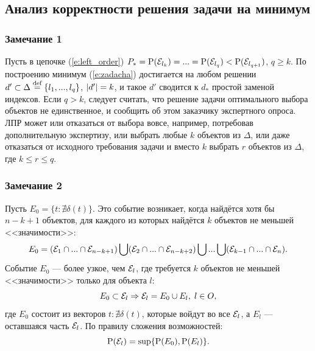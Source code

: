 \subsection{Анализ корректности решения задачи на минимум}
\subsubsection*{Замечание 1}

Пусть в цепочке (\ref{e:left_order}) $P_* = {\mathrm{P}}(\mathcal{E}_{l_k}) = ... = {\mathrm{P}}(\mathcal{E}_{l_q}) < {\mathrm{P}}(\mathcal{E}_{l_{q+1}})$, $q \geq k$. По построению минимум (\ref{e:zadacha}) достигается на любом решении $d' \subset \Delta \overset{\text{def}}{=} \{l_1, ..., l_q\}$, $\left| d' \right| = k$, и такое $d'$ сводится к $d_*$ простой заменой индексов. Если $q > k$, следует считать, что решение задачи оптимального выбора объектов не единственное, и сообщить об этом заказчику экспертного опроса. ЛПР может или отказаться от выбора вовсе, например, потребовав дополнительную экспертизу, или выбрать любые $k$ объектов из $\Delta$, или даже отказаться от исходного требования задачи и вместо $k$ выбрать $r$ объектов из $\Delta$, где $k \leq r \leq q$.

\subsubsection*{Замечание 2}
Пусть $E_0 = \{t: \nexists \delta(t)\}$. Это событие возникает, когда найдётся хотя бы $n-k+1$ объектов, для каждого из которых найдётся $k$ объектов не меньшей <<значимости>>:
\begin{equation*}
 E_0 = (\mathcal{E}_1 \cap ... \cap \mathcal{E}_{n-k+1}) \bigcup (\mathcal{E}_2 \cap ... \cap \mathcal{E}_{n-k+2}) \bigcup ... \bigcup (\mathcal{E}_{k-1} \cap ... \cap \mathcal{E}_{n}).
\end{equation*}
Событие $E_0$ --- более узкое, чем $\mathcal{E}_l$, где требуется $k$ объектов не меньшей <<значимости>> только для объекта $l$:
\begin{equation*}
 E_0 \subset \mathcal{E}_l \Rightarrow \mathcal{E}_l = E_0 \cup E_l,\;l \in O,
\end{equation*}
где $E_0$ состоит из векторов $t: \nexists \delta(t)$, которые войдут во все $\mathcal{E}_l$, а 
$E_l$ --- оставшаяся часть $\mathcal{E}_l$. По правилу сложения возможностей:
\begin{equation*}
 {\mathrm{P}}(\mathcal{E}_l) = \sup\{{\mathrm{P}}(E_0), {\mathrm{P}}(E_l)\}.
\end{equation*}
